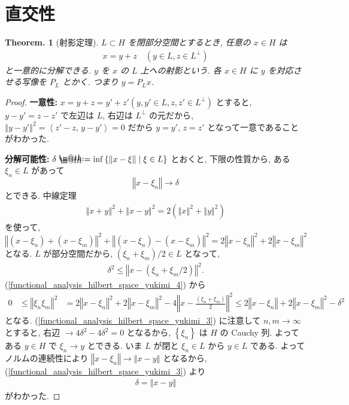 \documentclass[openany, a4paper, oneside]{jsbook}
\makeatletter
\newcommand*{\defeq}{\mathrel{\rlap{%
\raisebox{0.3ex}{$\m@th\cdot$}}%
\raisebox{-0.3ex}{$\m@th\cdot$}}%
=}
\theoremstyle{break}
\theoremstyle{breakdefn}
\newtheorem{thm}{Theorem.}[section]
\newcommand{\norm}[1]{\left\Vert#1\right\Vert}
\newcommand{\rbk}[1]{\left (#1\right)}
\newcommand{\cbk}[1]{\left\{#1\right\}}
\newcommand{\bkt}[2]{\left\langle#1,\,#2\right\rangle}
\newcommand{\relmiddle}[1]{\mathrel{}\middle#1\mathrel{}}
\newcommand{\set}[2]{\left\{#1 \relmiddle| #2\right\}}
\makeatother
\begin{document}
\section{直交性}


\begin{thm}[射影定理]
 $L \subset H$ を閉部分空間とするとき, 任意の $x \in H$ は
 \begin{align}
  x
  =
  y + z \quad (y \in L, z \in L^{\perp})
 \end{align}
 と一意的に分解できる.
 $y$ を $x$ の $L$ 上への射影という.
 各 $x \in H$ に $y$ を対応させる写像を $P_{L}$ とかく.
 つまり $y = P_{L}x$.
\end{thm}
\begin{proof}
\textbf{一意性:}
$x = y + z = y' + z' (y, y'\in L, z, z'\in L^{\perp})$ とすると,
$y - y' = z - z'$ で左辺は $L$, 右辺は $L^{\perp}$ の元だから,
$\norm{y - y'}^2 = \bkt{z' - z}{y - y'} = 0$ だから $y = y' $, $z = z'$ となって一意であることがわかった.

\textbf{分解可能性:}
$\delta \defeq \inf \set{\norm{x - \xi}}{\xi \in L}$ とおくと,
下限の性質から, ある $\xi_{n} \in L$ があって
\begin{equation}
 \norm{x - \xi_n}
 \longrightarrow
 \delta \label{functional_analysis_hilbert_space_yukimi_3}
\end{equation}
とできる.
中線定理
\begin{align}
 \norm{x + y}^2 + \norm{x - y}^2
 =
 2 \rbk{\norm{x}^2 + \norm{y}^2}
\end{align}
を使って,
\begin{equation}
 \norm{\rbk{x - \xi_n} + \rbk{x - \xi_m}}^2 + \norm{\rbk{x - \xi_n} - \rbk{x - \xi_m}}^2
 =
 2 \norm{x - \xi_n}^2 + 2 \norm{x - \xi_m}^2 \label{functional_analysis_hilbert_space_yukimi_4}
\end{equation}
となる.
$L$ が部分空間だから, $\rbk{\xi_{n} + \xi_{m}} / 2 \in L$ となって,
\begin{align}
 \delta^2
 \leq
 \norm{x - \rbk{\xi_{n} + \xi_{m}/2}}^2.
\end{align}
(\ref{functional_analysis_hilbert_space_yukimi_4}) から
\begin{align}
 0
 &\leq
 \norm{\xi_n \xi_m}^2
 &=
 2 \norm{x - \xi_n}^2 + 2 \norm{x - \xi_m}^2 - 4 \norm{x - \frac{\rbk{\xi_n + \xi_m}}{2}}^2
 \leq
 2 \norm{x - \xi_n} + 2 \norm{x - \xi_m}^2 - \delta^2
\end{align}
となる.
(\ref{functional_analysis_hilbert_space_yukimi_3}) に注意して
$n, m \to \infty$ とすると,
右辺 $\to 4 \delta^2 - 4\delta^2 = 0$ となるから,
$\cbk{\xi_{n}}$ は $H$ の Cauchy 列.
よってある $y \in H$ で $\xi_{n} \to y$ とできる.
いま $L$ が閉と $\xi_{n} \in L$ から $y \in L$ である.
よってノルムの連続性により $\norm{x - \xi_{n}} \to \norm{x - y}$ となるから,
(\ref{functional_analysis_hilbert_space_yukimi_3}) より
\begin{align}
 \delta
 =
 \norm{x - y}
\end{align}
がわかった.


\end{proof}
\end{document}
